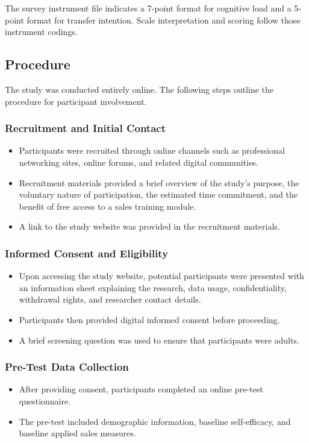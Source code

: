 \documentclass[12pt]{report}
\begin{document}
The survey instrument file indicates a 7-point format for cognitive load and a 5-point format for transfer intention. Scale interpretation and scoring follow those instrument codings.

\subsection{Procedure}
The study was conducted entirely online. The following steps outline the procedure for participant involvement.

\subsubsection{Recruitment and Initial Contact}
\begin{itemize}[leftmargin=1.2cm]
    \item Participants were recruited through online channels such as professional networking sites, online forums, and related digital communities.
    \item Recruitment materials provided a brief overview of the study's purpose, the voluntary nature of participation, the estimated time commitment, and the benefit of free access to a sales training module.
    \item A link to the study website was provided in the recruitment materials.
\end{itemize}

\subsubsection{Informed Consent and Eligibility}
\begin{itemize}[leftmargin=1.2cm]
    \item Upon accessing the study website, potential participants were presented with an information sheet explaining the research, data usage, confidentiality, withdrawal rights, and researcher contact details.
    \item Participants then provided digital informed consent before proceeding.
    \item A brief screening question was used to ensure that participants were adults.
\end{itemize}

\subsubsection{Pre-Test Data Collection}
\begin{itemize}[leftmargin=1.2cm]
    \item After providing consent, participants completed an online pre-test questionnaire.
    \item The pre-test included demographic information, baseline self-efficacy, and baseline applied sales measures.
\end{itemize}
\end{document}
